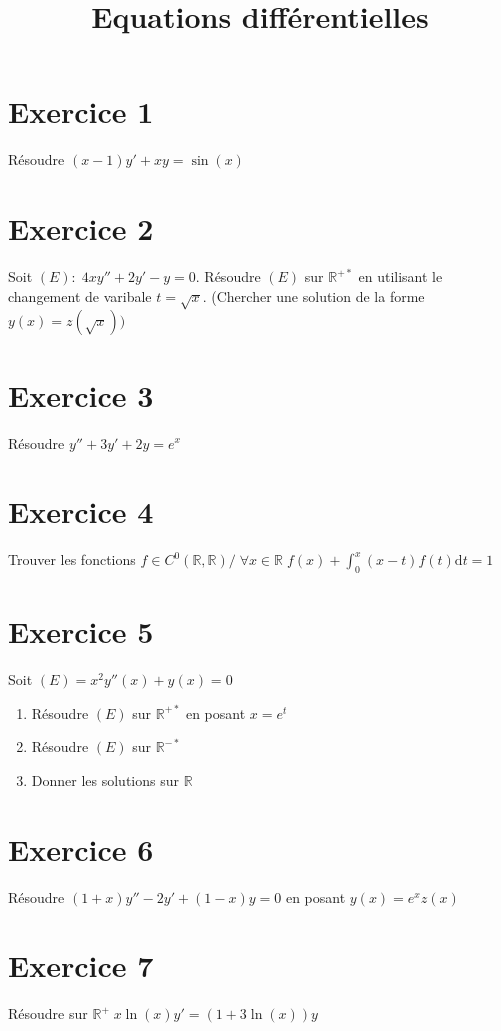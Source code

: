 \documentclass[11pt]{article}
\author{\Name \texttt{\Login}}
\date{}
\title{Equations différentielles}
\begin{document}
\maketitle

\section*{Exercice 1}

Résoudre $(x-1)y'+xy=\sin(x)$

\section*{Exercice 2}

Soit $(E): \;4xy''+2y'-y=0$. Résoudre $(E)$ sur $\mathbb{R}^{+*}$ en utilisant le changement de varibale $t=\sqrt{x}$. (Chercher une solution de la forme $y(x)=z(\sqrt{x}))$

\section*{Exercice 3}

Résoudre $y''+3y'+2y=e^x$

\section*{Exercice 4}

Trouver les fonctions $f\in C^0(\mathbb{R},\mathbb{R})/\; \forall x\in \mathbb{R} \; f(x)+\int_0^x (x-t)f(t)\mathrm{d}t=1$

\section*{Exercice 5}

Soit $(E)= x^2y''(x)+y(x)=0$
\begin{enumerate}
\item Résoudre $(E)$ sur $\mathbb{R}^{+*}$ en posant $x=e^t$
\item Résoudre $(E)$ sur $\mathbb{R}^{-*}$
\item Donner les solutions sur $\mathbb{R}$
\end{enumerate}

\section*{Exercice 6}

Résoudre $(1+x)y''-2y'+(1-x)y=0$ en posant $y(x)=e^xz(x)$

\section*{Exercice 7}

Résoudre sur $\mathbb{R}^{+} \; x\ln(x)y'=(1+3\ln(x))y$
\end{document}
